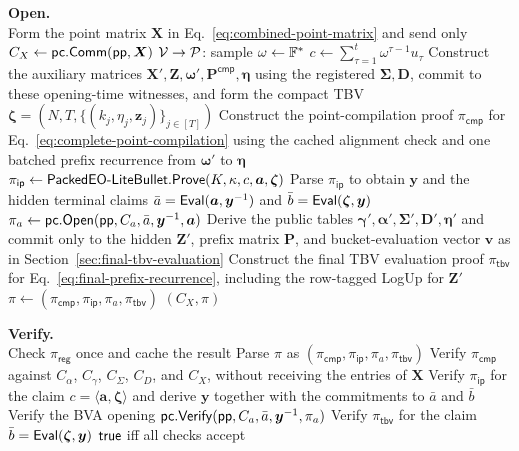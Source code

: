 \begin{algorithm}[!t]
\BlankLine
\textbf{Open.}\\
Form the point matrix $\bm X$ in Eq.~\eqref{eq:combined-point-matrix} and
send only $C_X\leftarrow{\sf pc}.{\sf Comm}({\sf pp},\bm X)$\;
${\mathcal{V} \rightarrow \mathcal{P}}$: sample $\omega \gets {\mathbb{F}}^*$\;
$c\leftarrow\sum_{\tau=1}^{t}\omega^{\tau-1}u_\tau$\;
Construct the auxiliary matrices
$\bm X',\bm Z,\bm\omega',\bm P^{\mathsf{cmp}},\bm\eta$ using the registered
$\bm\Sigma,\bm D$, commit to these opening-time witnesses, and form the compact TBV
$\bm\zeta=(N,T,\{(k_j,\eta_j,\bm z_j)\}_{j\in[T]})$\;
Construct the point-compilation proof $\pi_{\mathsf{cmp}}$ for
Eq.~\eqref{eq:complete-point-compilation} using the cached alignment check and
one batched prefix recurrence from $\bm\omega'$ to $\bm\eta$\;
$\pi_{\mathsf{ip}}\leftarrow
\mathsf{PackedEO\text{-}LiteBullet}.{\sf Prove}(K,\kappa,c,\bm a,\bm\zeta)$\;
Parse $\pi_{\mathsf{ip}}$ to obtain $\bm y$ and the hidden terminal claims
$\bar a=\mathsf{Eval}(\bm a, \bm y^{-1})$ and
$\bar b=\mathsf{Eval}(\bm\zeta, \bm y)$\;
$\pi_a\leftarrow{\sf pc}.{\sf Open}({\sf pp},C_a,\bar a,\bm y^{-1},\bm a)$\;
Derive the public tables
$\bm\gamma',\bm\alpha',\bm\Sigma',\bm D',\bm\eta'$ and commit only to
the hidden $\bm Z'$, prefix matrix $\bm P$, and bucket-evaluation vector
$\bm v$ as in Section~\ref{sec:final-tbv-evaluation}\;
Construct the final TBV evaluation proof $\pi_{\mathsf{tbv}}$ for
Eq.~\eqref{eq:final-prefix-recurrence}, including the row-tagged LogUp for
$\bm Z'$\;
$\pi\leftarrow(\pi_{\mathsf{cmp}},\pi_{\mathsf{ip}},\pi_a,\pi_{\mathsf{tbv}})$\;
\Return $(C_X,\pi)$\;

\BlankLine
\textbf{Verify.}\\
Check $\pi_{\mathsf{reg}}$ once and cache the result\;
Parse $\pi$ as
$(\pi_{\mathsf{cmp}},\pi_{\mathsf{ip}},\pi_a,\pi_{\mathsf{tbv}})$\;
Verify $\pi_{\mathsf{cmp}}$ against
$C_\alpha$, $C_\gamma$, $C_\Sigma$, $C_D$, and $C_X$, without receiving
the entries of $\bm X$\;
Verify $\pi_{\mathsf{ip}}$ for the claim
$c=\langle\bm a,\bm\zeta\rangle$ and derive $\bm y$ together with the
commitments to $\bar a$ and $\bar b$\;
Verify the BVA opening
${\sf pc}.{\sf Verify}({\sf pp},C_a,\bar a,\bm y^{-1},\pi_a)$\;
Verify $\pi_{\mathsf{tbv}}$ for the claim
$\bar b=\mathsf{Eval}(\bm\zeta, \bm y)$\;
\Return ${\sf true}$ iff all checks accept\;
\end{algorithm}
